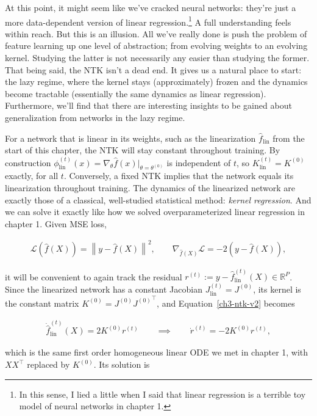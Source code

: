 At this point, it might seem like we've cracked neural networks: 
they're just a more data-dependent version of linear regression.\footnote{
    In this sense, I lied a little when I said that linear regression is a terrible toy model
    of neural networks in chapter 1.
} A full understanding feels within reach. But this is an illusion.
All we've really done is push the problem of feature learning up one level of abstraction; 
from evolving weights to an evolving kernel. Studying the latter is not necessarily any easier than studying 
the former. That being said, the NTK isn't a dead end. 
It gives us a natural place to start: the lazy regime, where the kernel stays (approximately) 
frozen and the dynamics become tractable (essentially the same dynamics as linear regression).
Furthermore, we'll find that there are interesting insights to be gained about generalization
from networks in the lazy regime.

For a network that is linear in its weights, such as the linearization $\hat{f}_{\text{lin}}$ from
the start of this chapter, the NTK will stay constant throughout training. By construction
$\phi^{(t)}_{\text{lin}}(x) = \nabla_{\theta}\hat{f}(x)\rvert_{\theta=\theta^{(0)}}$ is independent
of $t$, so $K_{\text{lin}}^{(t)} = K^{(0)}$ exactly, for all $t$. 
Conversely, a fixed NTK implies that the network equals its linearization throughout training.
The dynamics of the linearized network are exactly those of a classical, well-studied statistical method:
\textit{kernel regression}. And we can solve it exactly like how we solved overparameterized 
linear regression in chapter 1. Given MSE loss,

\begin{align}
\mathcal{L}\left(\hat{f}(X)\right) = \left\|y-\hat{f}(X)\right\|^2,
\qquad
\nabla_{\hat{f}(X)}\mathcal{L} = -2\left(y-\hat{f}(X)\right),
\end{align}

it will be convenient to again track the residual
$r^{(t)} := y - \hat{f}^{(t)}_{\text{lin}}(X)\in\mathbb{R}^P$.
Since the linearized network has a constant Jacobian
$J_{\text{lin}}^{(t)} = J^{(0)}$, its kernel is the constant matrix
$K^{(0)} = J^{(0)}{J^{(0)}}^\top$, and Equation~\eqref{ch3-ntk-v2} becomes

\begin{align}
\dot{\hat{f}}^{(t)}_{\text{lin}}(X) = 2 K^{(0)} r^{(t)}
\qquad\implies\qquad
\dot{r}^{(t)} = -2 K^{(0)} r^{(t)},
\end{align}

which is the same first order homogeneous linear ODE we met in chapter 1,
with $XX^\top$ replaced by $K^{(0)}$. Its solution is

